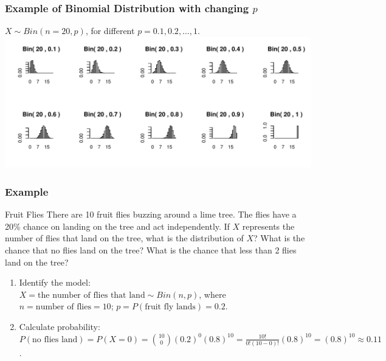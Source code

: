 \documentclass[t,xcolor=pdftex,dvipsnames,table]{beamer}\usepackage[]{graphicx}\usepackage[]{color}
\makeatletter
\def\maxwidth{ %
  \ifdim\Gin@nat@width>\linewidth
    \linewidth
  \else
    \Gin@nat@width
  \fi
}
\newenvironment{knitrout}{}{} %
\makeatother
\begin{document}
\begin{frame}[fragile]\frametitle{Example of Binomial Distribution with changing $p$}

$X \sim Bin(n=20,p)$, for different $p=0.1,0.2,\ldots ,1$. \\

\vspace{0.5cm}
\begin{knitrout}
\color{fgcolor}
\includegraphics[width=\maxwidth]{figure/unnamed-chunk-69-1} 

\end{knitrout}

\end{frame}



\begin{frame}\frametitle{Example}
\begin{block}{Fruit Flies}
There are 10 fruit flies buzzing around a lime tree. The flies have a 20\% chance on landing on the tree and act independently.
If $X$ represents the number of flies that land on the tree, what is the distribution of $X$?  What is the chance that no flies land on the tree? What is the chance that less than 2 flies land on the tree? 

\vspace{.5cm}
\begin{enumerate}
\item Identify the model: \\
$X = \mbox{the number of flies that land} \sim Bin(n,p)$, where
$n= \mbox{number of flies} = 10$;
$p=P(\mbox{fruit fly lands}) =0.2$.
\item  
Calculate probability:\\
$P(\mbox{no flies land}) = P(X=0) = {10 \choose 0} (0.2)^0 (0.8)^{10} = \frac{10!}{0! (10-0)!} (0.8)^{10} =(0.8)^{10} \approx 0.11$.
\end{enumerate}
\end{block}
\end{frame}
\end{document}
